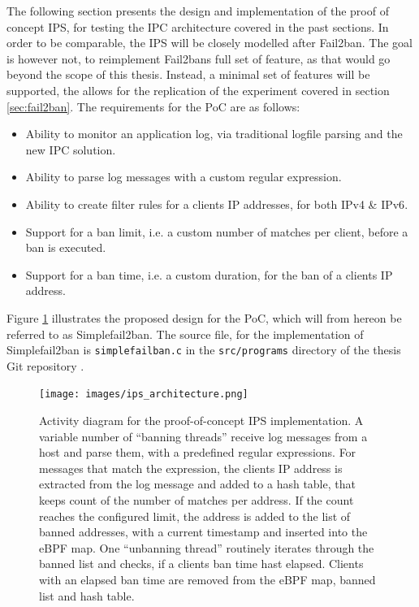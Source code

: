 The following section presents the design and implementation of the proof of concept \ac{IPS}, for testing the \ac{IPC} architecture covered in the past sections.
In order to be comparable, the \ac{IPS} will be closely modelled after Fail2ban. The goal is however not, to reimplement Fail2bans full set of feature, as that would go beyond
the scope of this thesis. Instead, a minimal set of features will be supported, the allows for the replication of the experiment covered in section \ref{sec:fail2ban}. 
The requirements for the \ac{PoC} are as follows:
\begin{itemize}
    \item Ability to monitor an application log, via traditional logfile parsing and the new \ac{IPC} solution.
    \item Ability to parse log messages with a custom regular expression.
    \item Ability to create filter rules for a clients IP addresses, for both \ac{IPv4} \& \ac{IPv6}.
    \item Support for a ban limit, i.e. a custom number of matches per client, before a ban is executed.
    \item Support for a ban time, i.e. a custom duration, for the ban of a clients IP address. 
\end{itemize} 

Figure \ref{fig:ips_architecture} illustrates the proposed design for the \ac{PoC}, which will from hereon be referred to as Simplefail2ban. The source file, 
for the implementation of Simplefail2ban is \texttt{simplefailban.c} in the \texttt{src/programs} directory of the thesis Git repository \cite{gitlab}.


\begin{figure}[p]
    \texttt{[image: images/ips\_architecture.png]}
    \caption[Simplefail2ban Architecture]{Activity diagram for the proof-of-concept IPS implementation. A variable number of ``banning threads'' receive log messages from a host and
    parse them, with a predefined regular expressions. For messages that match the expression, the clients IP address is extracted from the log message and added to a hash table, that keeps count of
    the number of matches per address. If the count reaches the configured limit, the address is added to the list of banned addresses, with a current timestamp and inserted into the eBPF map. One ``unbanning
   thread'' routinely iterates through the banned list and checks, if a clients ban time hast elapsed. Clients with an elapsed ban time are removed from the eBPF map, banned list and hash table.}
   \label{fig:ips_architecture}
\end{figure}

